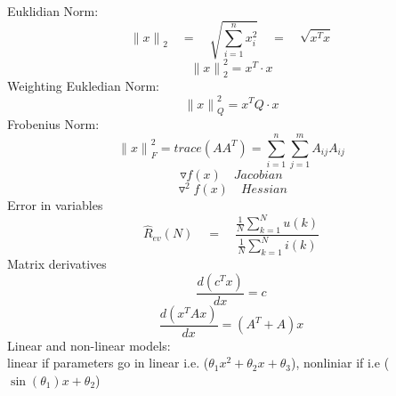 \begin{tcolorbox}[colback=blue!5!white,colframe=blue!75!black,title=\textbf{Introduction}]
Euklidian Norm: 
\begin{equation*}
{ \parallel x\parallel  }_{ 2 }\quad =\quad \sqrt { \sum _{ i=1 }^{ n }{ { x }_{ i }^{ 2 } }  } \quad =\quad \sqrt { { x }^{ T }x }
\end{equation*}
\begin{equation*}
{\parallel x\parallel  }_{ 2 }^{ 2 } = x^T\cdot x
\end{equation*}
Weighting Eukledian Norm:
\begin{equation*}
{\parallel x\parallel  }_{ Q }^{ 2 } = x^TQ \cdot x
\end{equation*}
Frobenius Norm:
\begin{equation*}
{\parallel x\parallel  }_{ F }^{ 2 } = trace(A{ A }^{ T })=\sum _{ i=1 }^{ n } \sum _{ j=1 }^{ m }{ { A }_{ ij }{ A }_{ ij } } 
\end{equation*}
\begin{equation*}
\triangledown f(x) \quad Jacobian
\end{equation*}
\begin{equation*}
{ \triangledown  }^{ 2 }f(x)\quad Hessian
\end{equation*}
\tcblower
Error in variables
\begin{equation*}
\hat { R } _{ ev }(N)\quad =\quad \frac { \frac { 1 }{ N } \sum _{ k=1 }^{ N }{ u(k) }  }{ \frac { 1 }{ N } \sum _{ k=1 }^{ N }{ i(k) }  }
\end{equation*}
Matrix derivatives
\begin{equation*}
\frac{d(c^Tx)}{dx} = c
\end{equation*} 
\begin{equation*}
\frac{d(x^TAx)}{dx} = (A^T + A)x
\end{equation*} 
Linear and non-linear models:\\
linear if parameters go in linear i.e. ($\theta_1 x^2 + \theta_2 x + \theta_3$), nonliniar if i.e ($\sin(\theta_1)x + \theta_2$) 


\end{tcolorbox}
